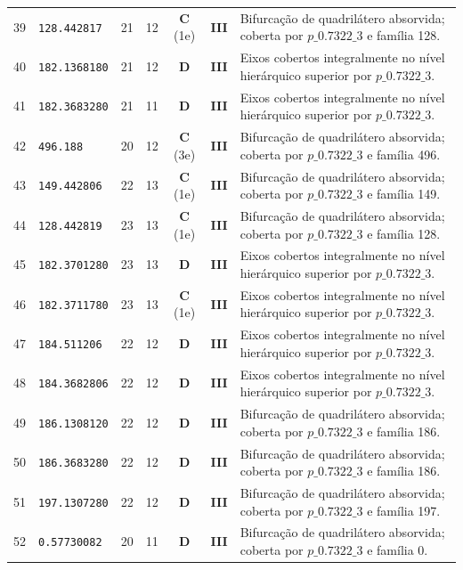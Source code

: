 \documentclass[11pt,a4paper]{article}
\begin{document}
\begin{small}
\begin{longtable}{r l c c c c p{8.8cm}}
39 & \texttt{128.442817} & 21 & 12 & \textbf{C} (1e) & \textbf{III} & Bifurcação de quadrilátero absorvida; coberta por $p\_0.7322\_3$ e família 128. \\
40 & \texttt{182.1368180} & 21 & 12 & \textbf{D} & \textbf{III} & Eixos cobertos integralmente no nível hierárquico superior por $p\_0.7322\_3$. \\
41 & \texttt{182.3683280} & 21 & 11 & \textbf{D} & \textbf{III} & Eixos cobertos integralmente no nível hierárquico superior por $p\_0.7322\_3$. \\
42 & \texttt{496.188} & 20 & 12 & \textbf{C} (3e) & \textbf{III} & Bifurcação de quadrilátero absorvida; coberta por $p\_0.7322\_3$ e família 496. \\
43 & \texttt{149.442806} & 22 & 13 & \textbf{C} (1e) & \textbf{III} & Bifurcação de quadrilátero absorvida; coberta por $p\_0.7322\_3$ e família 149. \\
44 & \texttt{128.442819} & 23 & 13 & \textbf{C} (1e) & \textbf{III} & Bifurcação de quadrilátero absorvida; coberta por $p\_0.7322\_3$ e família 128. \\
45 & \texttt{182.3701280} & 23 & 13 & \textbf{D} & \textbf{III} & Eixos cobertos integralmente no nível hierárquico superior por $p\_0.7322\_3$. \\
46 & \texttt{182.3711780} & 23 & 13 & \textbf{C} (1e) & \textbf{III} & Eixos cobertos integralmente no nível hierárquico superior por $p\_0.7322\_3$. \\
47 & \texttt{184.511206} & 22 & 12 & \textbf{D} & \textbf{III} & Eixos cobertos integralmente no nível hierárquico superior por $p\_0.7322\_3$. \\
48 & \texttt{184.3682806} & 22 & 12 & \textbf{D} & \textbf{III} & Eixos cobertos integralmente no nível hierárquico superior por $p\_0.7322\_3$. \\
49 & \texttt{186.1308120} & 22 & 12 & \textbf{D} & \textbf{III} & Bifurcação de quadrilátero absorvida; coberta por $p\_0.7322\_3$ e família 186. \\
50 & \texttt{186.3683280} & 22 & 12 & \textbf{D} & \textbf{III} & Bifurcação de quadrilátero absorvida; coberta por $p\_0.7322\_3$ e família 186. \\
51 & \texttt{197.1307280} & 22 & 12 & \textbf{D} & \textbf{III} & Bifurcação de quadrilátero absorvida; coberta por $p\_0.7322\_3$ e família 197. \\
52 & \texttt{0.57730082} & 20 & 11 & \textbf{D} & \textbf{III} & Bifurcação de quadrilátero absorvida; coberta por $p\_0.7322\_3$ e família 0. \\

\end{longtable}
\end{small}
\end{document}
